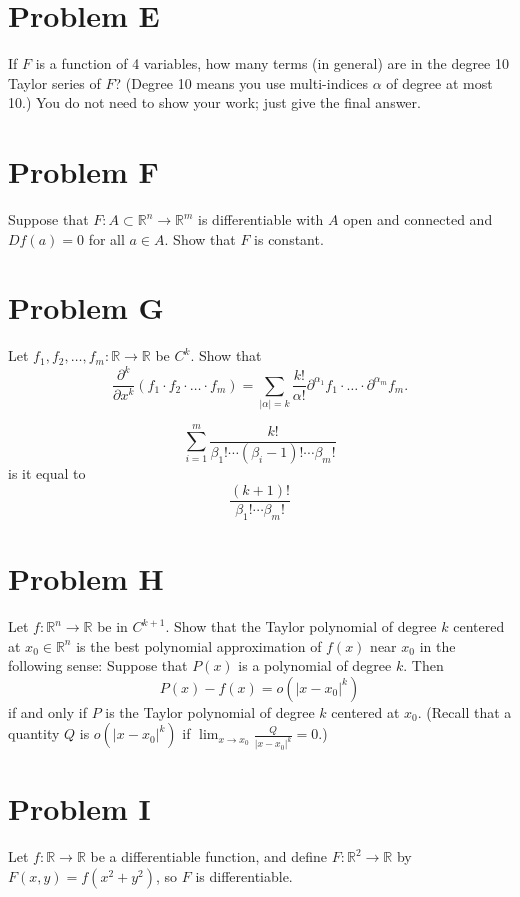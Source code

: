 \documentclass[lang=en,11pt]{template}
\begin{document}
\section*{Problem E}
If $F$ is a function of 4 variables, how many terms (in general) are in the degree 10 Taylor series of $F$? (Degree 10 means you use multi-indices $\alpha$ of degree at most 10.) You do not need to show your work; just give the final answer.

\section*{Problem F}
Suppose that $F : A \subset \mathbb{R}^n \to \mathbb{R}^m$ is differentiable with $A$ open and connected and $Df(a) = 0$ for all $a \in A$. Show that $F$ is constant.

\section*{Problem G}
Let $f_1, f_2, \ldots, f_m : \mathbb{R} \to \mathbb{R}$ be $C^k$. Show that
\[
\frac{\partial^k}{\partial x^k}(f_1 \cdot f_2 \cdot \ldots \cdot f_m) = \sum_{|\alpha| = k} \frac{k!}{\alpha!} \partial^{\alpha_1} f_1 \cdot \ldots \cdot \partial^{\alpha_m} f_m.
\]


$$
\sum_{i=1}^m \frac{k!}{\beta_1 ! \cdots (\beta_i- 1)! \cdots \beta_m !}
$$
is it equal to 
$$
 \frac{(k+1)!}{\beta_1 !  \cdots \beta_m !}
$$


\section*{Problem H}
Let $f : \mathbb{R}^n \to \mathbb{R}$ be in $C^{k+1}$. Show that the Taylor polynomial of degree $k$ centered at $x_0 \in \mathbb{R}^n$ is the best polynomial approximation of $f(x)$ near $x_0$ in the following sense: Suppose that $P(x)$ is a polynomial of degree $k$. Then
\[
P(x) - f(x) = o(|x - x_0|^k)
\]
if and only if $P$ is the Taylor polynomial of degree $k$ centered at $x_0$. (Recall that a quantity $Q$ is $o(|x - x_0|^k)$ if $\lim_{x \to x_0} \frac{Q}{|x - x_0|^k} = 0$.)


\section*{Problem I}
Let $f : \mathbb{R} \to \mathbb{R}$ be a differentiable function, and define $F : \mathbb{R}^2 \to \mathbb{R}$ by $F(x, y) = f(x^2 + y^2)$, so $F$ is differentiable.
\end{document}

